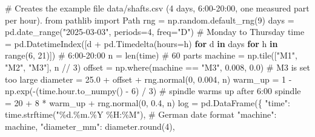 \documentclass[
  letterpaper,
  DIV=11,
  numbers=noendperiod]{scrreprt}
\newenvironment{Shaded}{\begin{snugshade}}{\end{snugshade}}
\newcommand{\BuiltInTok}[1]{\textcolor[rgb]{0.00,0.23,0.31}{#1}}
\newcommand{\CommentTok}[1]{\textcolor[rgb]{0.37,0.37,0.37}{#1}}
\newcommand{\ControlFlowTok}[1]{\textcolor[rgb]{0.00,0.23,0.31}{\textbf{#1}}}
\newcommand{\DecValTok}[1]{\textcolor[rgb]{0.68,0.00,0.00}{#1}}
\newcommand{\FloatTok}[1]{\textcolor[rgb]{0.68,0.00,0.00}{#1}}
\newcommand{\ImportTok}[1]{\textcolor[rgb]{0.00,0.46,0.62}{#1}}
\newcommand{\KeywordTok}[1]{\textcolor[rgb]{0.00,0.23,0.31}{\textbf{#1}}}
\newcommand{\NormalTok}[1]{\textcolor[rgb]{0.00,0.23,0.31}{#1}}
\newcommand{\OperatorTok}[1]{\textcolor[rgb]{0.37,0.37,0.37}{#1}}
\newcommand{\SpecialCharTok}[1]{\textcolor[rgb]{0.37,0.37,0.37}{#1}}
\newcommand{\StringTok}[1]{\textcolor[rgb]{0.13,0.47,0.30}{#1}}
\begin{document}
\begin{Shaded}
\begin{Highlighting}[]
\CommentTok{\# Creates the example file data/shafts.csv (4 days, 6:00{-}20:00, one measured part per hour).}
\ImportTok{from}\NormalTok{ pathlib }\ImportTok{import}\NormalTok{ Path}
\NormalTok{rng }\OperatorTok{=}\NormalTok{ np.random.default\_rng(}\DecValTok{9}\NormalTok{)}
\NormalTok{days }\OperatorTok{=}\NormalTok{ pd.date\_range(}\StringTok{"2025{-}03{-}03"}\NormalTok{, periods}\OperatorTok{=}\DecValTok{4}\NormalTok{, freq}\OperatorTok{=}\StringTok{"D"}\NormalTok{)                 }\CommentTok{\# Monday to Thursday}
\NormalTok{time }\OperatorTok{=}\NormalTok{ pd.DatetimeIndex([d }\OperatorTok{+}\NormalTok{ pd.Timedelta(hours}\OperatorTok{=}\NormalTok{h) }\ControlFlowTok{for}\NormalTok{ d }\KeywordTok{in}\NormalTok{ days }\ControlFlowTok{for}\NormalTok{ h }\KeywordTok{in} \BuiltInTok{range}\NormalTok{(}\DecValTok{6}\NormalTok{, }\DecValTok{21}\NormalTok{)])  }\CommentTok{\# 6:00{-}20:00}
\NormalTok{n }\OperatorTok{=} \BuiltInTok{len}\NormalTok{(time)                                                           }\CommentTok{\# 60 parts}
\NormalTok{machine }\OperatorTok{=}\NormalTok{ np.tile([}\StringTok{"M1"}\NormalTok{, }\StringTok{"M2"}\NormalTok{, }\StringTok{"M3"}\NormalTok{], n }\OperatorTok{//} \DecValTok{3}\NormalTok{)}
\NormalTok{offset }\OperatorTok{=}\NormalTok{ np.where(machine }\OperatorTok{==} \StringTok{"M3"}\NormalTok{, }\FloatTok{0.008}\NormalTok{, }\FloatTok{0.0}\NormalTok{)                         }\CommentTok{\# M3 is set too large}
\NormalTok{diameter }\OperatorTok{=} \FloatTok{25.0} \OperatorTok{+}\NormalTok{ offset }\OperatorTok{+}\NormalTok{ rng.normal(}\DecValTok{0}\NormalTok{, }\FloatTok{0.004}\NormalTok{, n)}
\NormalTok{warm\_up }\OperatorTok{=} \DecValTok{1} \OperatorTok{{-}}\NormalTok{ np.exp(}\OperatorTok{{-}}\NormalTok{(time.hour.to\_numpy() }\OperatorTok{{-}} \DecValTok{6}\NormalTok{) }\OperatorTok{/} \DecValTok{3}\NormalTok{)                  }\CommentTok{\# spindle warms up after 6:00}
\NormalTok{spindle }\OperatorTok{=} \DecValTok{20} \OperatorTok{+} \DecValTok{8} \OperatorTok{*}\NormalTok{ warm\_up }\OperatorTok{+}\NormalTok{ rng.normal(}\DecValTok{0}\NormalTok{, }\FloatTok{0.4}\NormalTok{, n)}
\NormalTok{log }\OperatorTok{=}\NormalTok{ pd.DataFrame(\{}
    \StringTok{"time"}\NormalTok{: time.strftime(}\StringTok{"}\SpecialCharTok{\%d}\StringTok{.\%m.\%Y \%H:\%M"}\NormalTok{),                           }\CommentTok{\# German date format}
    \StringTok{"machine"}\NormalTok{: machine,}
    \StringTok{"diameter\_mm"}\NormalTok{: diameter.}\BuiltInTok{round}\NormalTok{(}\DecValTok{4}\NormalTok{),}

\end{Highlighting}
\end{Shaded}
\end{document}
